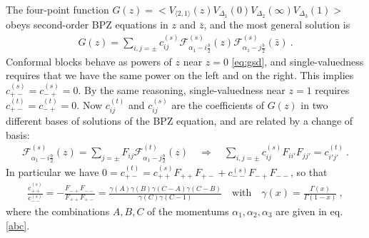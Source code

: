 \documentclass[12pt, a4paper]{article}
\theoremstyle{break}
\begin{document}
The four-point function $G(z) = \Big< V_{\langle 2, 1 \rangle}(z) V_{\Delta_1}(0)V_{\Delta_2}(\infty)V_{\Delta_3}(1) \Big>$ obeys second-order BPZ equations in $z$ and $\bar z$, and the most general solution is
\begin{align}
 G(z) = \sum_{i,j=\pm} c^{(s)}_{ij} \mathcal{F}^{(s)}_{\alpha_1-i\frac{b}{2}}(z) \mathcal{F}^{(s)}_{\alpha_1-j\frac{b}{2}}(\bar z)\ .
\end{align}
Conformal blocks behave as powers of $z$ near $z=0$ \eqref{eq:gsd}, and single-valuedness requires that we have the same power on the left and on the right. This implies $c^{(s)}_{+-} = c^{(s)}_{-+}=0$. By the same reasoning, single-valuedness near $z=1$ requires $c^{(t)}_{+-}=c^{(t)}_{-+}=0$. Now $c^{(t)}_{ij}$ and $c^{(s)}_{ij}$ are the coefficients of $G(z)$ in two different bases of solutions of the BPZ equation, and are related by a change of basis:
\begin{align}
 \mathcal{F}^{(s)}_{\alpha_1-i\frac{b}{2}}(z) = \sum_{j=\pm} F_{ij} \mathcal{F}^{(t)}_{\alpha_1-j\frac{b}{2}}(z) \quad \Rightarrow \quad \sum_{i,j=\pm} c^{(s)}_{ij} F_{ii'} F_{jj'} = c^{(t)}_{i'j'}\ .
\end{align}
In particular we have $0 = c^{(t)}_{+-}= c_{++}^{(s)} F_{++}F_{+-} + c_{--}^{(s)} F_{-+}F_{--}$, so that
\begin{align}
 \frac{c_{++}^{(s)}}{c_{--}^{(s)}} = -\frac{F_{-+}F_{--}}{F_{++}F_{+-}} 
 = \frac{\gamma(A)\gamma(B)\gamma(C-A)\gamma(C-B)}{\gamma(C)\gamma(C-1)}\quad \text{with} \quad \gamma(x) =\frac{\Gamma(x)}{\Gamma(1-x)}\ ,
 \label{eq:coc}
\end{align}
where the combinations $A,B,C$ of the momentums $\alpha_1,\alpha_2,\alpha_3$ are given in eq. \eqref{abc}.
\end{document}
